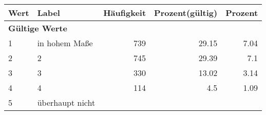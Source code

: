      \begin{longtable}{lXrrr}
     \toprule
     \textbf{Wert} & \textbf{Label} & \textbf{Häufigkeit} & \textbf{Prozent(gültig)} & \textbf{Prozent} \\
     \endhead
     \midrule
     \multicolumn{5}{l}{\textbf{Gültige Werte}}\\

     1 &
     \multicolumn{1}{X}{ in hohem Maße   } &


       \num{739} &
       \num[round-mode=places,round-precision=2]{29,15} &
         \num[round-mode=places,round-precision=2]{7,04} \\

     2 &
     \multicolumn{1}{X}{ 2   } &


       \num{745} &
       \num[round-mode=places,round-precision=2]{29,39} &
         \num[round-mode=places,round-precision=2]{7,1} \\

     3 &
     \multicolumn{1}{X}{ 3   } &


       \num{330} &
       \num[round-mode=places,round-precision=2]{13,02} &
         \num[round-mode=places,round-precision=2]{3,14} \\

     4 &
     \multicolumn{1}{X}{ 4   } &


       \num{114} &
       \num[round-mode=places,round-precision=2]{4,5} &
         \num[round-mode=places,round-precision=2]{1,09} \\

     5 &
     \multicolumn{1}{X}{ überhaupt nicht   } &



\end{longtable}
